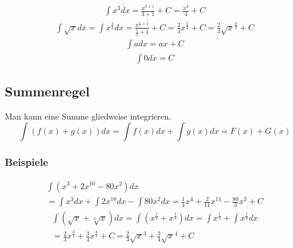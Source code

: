 \documentclass[12pt, a4paper]{report}
\begin{document}
\begin{fleqn}[\parindent]
\begin{equation}
\begin{split}
\int x^3 dx = \frac{x^{3+1}}{3+1}+C = \frac{x^{4}}{4}+C
\end{split}
\end{equation}
\begin{equation}
\begin{split}
\int \sqrt{x} dx = \int x^{\frac{1}{2}} dx = \frac{x^{\frac{1}{2}+1}}{\frac{1}{2}+1}+C=\frac{2}{3}x^{\frac{3}{2}}+C=\frac{2}{3}\sqrt{x}^{\frac{3}{2}}+C
\end{split}
\end{equation}
\begin{equation}
\begin{split}
\int adx = ax+C
\end{split}
\end{equation}
\begin{equation}
\begin{split}
\int 0dx = C
\end{split}
\end{equation}
\end{fleqn}

\subsection{Summenregel}

Man kann eine Summe gliedweise integrieren.
\begin{equation}
\int (f(x)+g(x)) dx = \int f(x)dx+\int g(x)dx=F(x)+G(x)
\end{equation}

\subsubsection{Beispiele}

\begin{fleqn}[\parindent]
\begin{multline}
\int (x^3 + 2x^{10}-80x^2)dx\\=
\int x^3dx + \int 2x^{10}dx - \int 80x^2dx = \frac{1}{4}x^4 + \frac{2}{11}x^{11} - \frac{80}{3}x^3 + C
\end{multline}
\begin{multline}
\int (\sqrt{x} + \sqrt[3]{x}) dx = \int (x^{\frac{1}{2}}+x^{\frac{1}{3}}) dx =\int x^{\frac{1}{2}}+\int x^{\frac{1}{3}} dx\\ =
\frac{2}{3}x^{\frac{3}{2}} + \frac{3}{4}x^{\frac{4}{3}} + C = \frac{2}{3}\sqrt{x}^3 + \frac{3}{4}\sqrt{x}^4 +C
\end{multline}
\end{fleqn}
\end{document}
